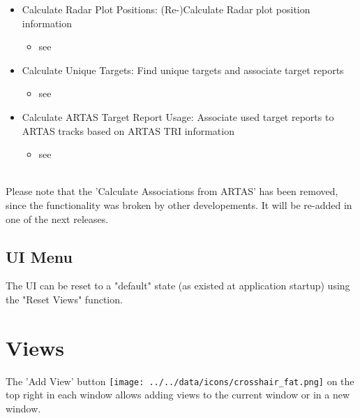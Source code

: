\begin{itemize}
 \item Calculate Radar Plot Positions: (Re-)Calculate Radar plot position information
   \begin{itemize}
 \item see 
 \end{itemize}
 \item Calculate Unique Targets: Find unique targets and associate target reports
   \begin{itemize}
 \item see 
 \end{itemize}
 \item Calculate ARTAS Target Report Usage: Associate used target reports to ARTAS tracks based on ARTAS TRI information
   \begin{itemize}
   \item see 
   \end{itemize}
\end{itemize}
\  \\

Please note that the 'Calculate Associations from ARTAS' has been removed, since the functionality was broken by other developements. It will be re-added in one of the next releases.

\subsection{UI Menu}
\label{sec:ui_overview_ui_menu}

The UI can be reset to a "default" state (as existed at application startup) using the "Reset Views" function.








%

% 
% 

% 

\section{Views}
The 'Add View' button \texttt{[image: ../../data/icons/crosshair\_fat.png]} on the top right in each window allows adding views to the current window or in a new window. \\

